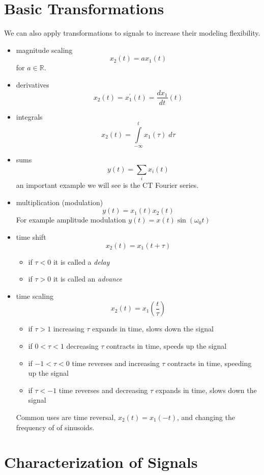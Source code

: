 \section{Basic Transformations}

We can also apply transformations to signals to increase their modeling flexibility.
  
\begin{itemize}
\item  magnitude scaling
  \[
  x_2(t) = a x_1(t)
  \]
  for $a \in \mathbb{R}$.
\item derivatives
  \[
  x_2(t) = x_1^\prime(t) = \frac{d x_1}{dt}(t)
  \]
\item integrals
  \[
  x_2(t) = \int\limits_{-\infty}^t x_1(\tau) \; d\tau
  \]
\item sums
  \[
  y(t) = \sum\limits_{i} x_i(t)
  \]
  an important example we will see is the CT Fourier series.  
\item multiplication (modulation)
  \[
  y(t) = x_1(t) x_2(t)
  \]
  For example amplitude modulation $y(t) = x(t)\sin(\omega_0 t)$
\item time shift
  \[
  x_2(t) = x_1(t+\tau)
  \]
  \begin{itemize}
  \item if $\tau <0$ it is called a {\it delay}
  \item if $\tau >0$ it is called an {\it advance}
  \end{itemize}
  \item time scaling
    \[
    x_2(t) = x_1\left(\frac{t}{\tau}\right)
    \]
    \begin{itemize}
    \item if $\tau >1$ increasing $\tau$ expands in time, slows down the signal
    \item if $0 < \tau < 1$ decreasing $\tau$ contracts in time, speeds up the signal
    \item if $-1 < \tau <0$ time reverses and increasing $\tau$ contracts in time, speeding up the signal
    \item if $\tau < -1$ time reverses and decreasing $\tau$ expands in time, slows down the signal
    \end{itemize}
    Common uses are time reversal, $x_2(t) = x_1(-t)$, and changing the frequency of of sinusoids.
\end{itemize}

\section{Characterization of Signals}

